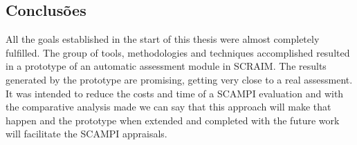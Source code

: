 \documentclass[9pt,a4paper]{extarticle}
\begin{document}
\begin{multicols}{2}
\subsection{Conclusões}

All the goals established in the start of this thesis were almost completely fulfilled. The group of tools, methodologies and techniques accomplished resulted in a prototype of an automatic assessment module in SCRAIM. The results generated by the prototype are promising, getting very close to a real assessment.
It was intended to reduce the costs and time of a SCAMPI evaluation and with the comparative analysis made we can say that this approach will make that happen and the prototype when extended and completed with the future work will facilitate the SCAMPI appraisals.




\end{multicols}
\end{document}
